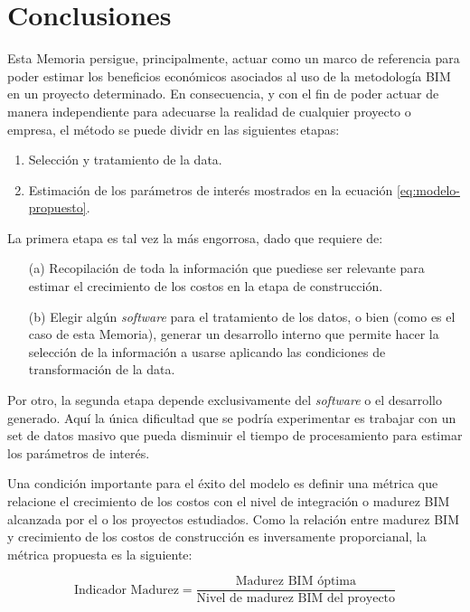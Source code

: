 \chapter*{Conclusiones}

Esta Memoria persigue, principalmente, actuar como un marco de referencia para poder estimar los beneficios económicos asociados al uso de la metodología BIM en un proyecto determinado. En consecuencia, y con el fin de poder actuar de manera independiente para adecuarse la realidad de cualquier proyecto o empresa, el método se puede dividr en las siguientes etapas:

\begin{enumerate}
    \item Selección y tratamiento de la data.
    \item Estimación de los parámetros de interés mostrados en la ecuación \eqref{eq:modelo-propuesto}.
\end{enumerate}

La primera etapa es tal vez la más engorrosa, dado que requiere de:

\begin{enumerate}
    \item [(a)] Recopilación de toda la información que puediese ser relevante para estimar el crecimiento de los costos en la etapa de construcción.
    \item [(b)] Elegir algún \emph{software} para el tratamiento de los datos, o bien (como es el caso de esta Memoria), generar un desarrollo interno que permite hacer la selección de la información a usarse aplicando las condiciones de transformación de la data.
\end{enumerate}

Por otro, la segunda etapa depende exclusivamente del \emph{software} o el desarrollo generado. Aquí la única dificultad que se podría experimentar es trabajar con un set de datos masivo que pueda disminuir el tiempo de procesamiento para estimar los parámetros de interés.

Una condición importante para el éxito del modelo es definir una métrica que relacione el crecimiento de los costos con el nivel de integración o madurez BIM alcanzada por el o los proyectos estudiados. Como la relación entre madurez BIM y crecimiento de los costos de construcción es inversamente proporcianal, la métrica propuesta es la siguiente:

\begin{equation*}
    \text{Indicador Madurez} = \frac{\text{Madurez BIM óptima}}{\text{Nivel de madurez BIM del proyecto}}
\end{equation*}

